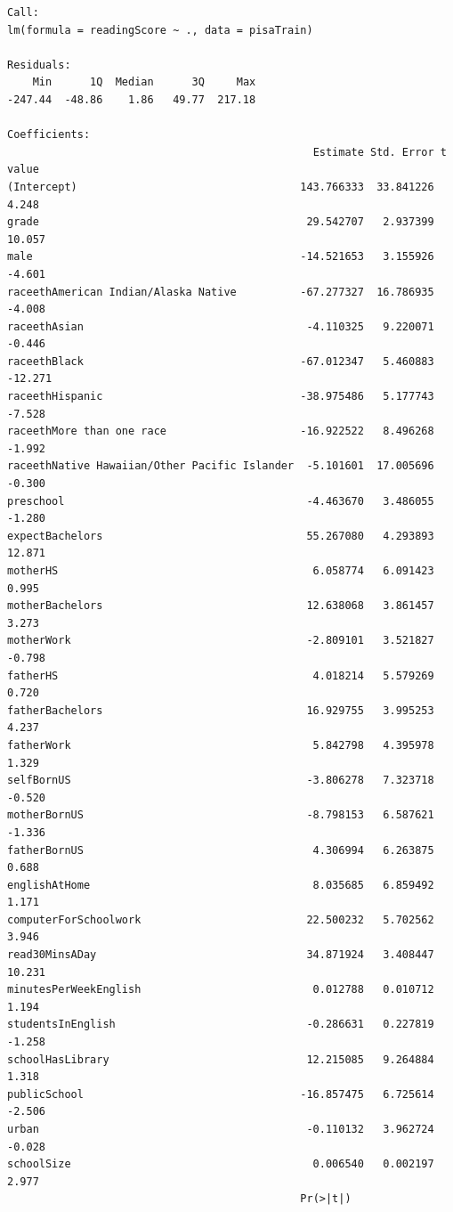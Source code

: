 \documentclass[letterpaper, 9pt, onecolumn, twoside, technote, final]{IEEEtran}
\begin{document}
\begin{verbatim}
Call:
lm(formula = readingScore ~ ., data = pisaTrain)

Residuals:
    Min      1Q  Median      3Q     Max
-247.44  -48.86    1.86   49.77  217.18

Coefficients:
                                                Estimate Std. Error t value
(Intercept)                                   143.766333  33.841226   4.248
grade                                          29.542707   2.937399  10.057
male                                          -14.521653   3.155926  -4.601
raceethAmerican Indian/Alaska Native          -67.277327  16.786935  -4.008
raceethAsian                                   -4.110325   9.220071  -0.446
raceethBlack                                  -67.012347   5.460883 -12.271
raceethHispanic                               -38.975486   5.177743  -7.528
raceethMore than one race                     -16.922522   8.496268  -1.992
raceethNative Hawaiian/Other Pacific Islander  -5.101601  17.005696  -0.300
preschool                                      -4.463670   3.486055  -1.280
expectBachelors                                55.267080   4.293893  12.871
motherHS                                        6.058774   6.091423   0.995
motherBachelors                                12.638068   3.861457   3.273
motherWork                                     -2.809101   3.521827  -0.798
fatherHS                                        4.018214   5.579269   0.720
fatherBachelors                                16.929755   3.995253   4.237
fatherWork                                      5.842798   4.395978   1.329
selfBornUS                                     -3.806278   7.323718  -0.520
motherBornUS                                   -8.798153   6.587621  -1.336
fatherBornUS                                    4.306994   6.263875   0.688
englishAtHome                                   8.035685   6.859492   1.171
computerForSchoolwork                          22.500232   5.702562   3.946
read30MinsADay                                 34.871924   3.408447  10.231
minutesPerWeekEnglish                           0.012788   0.010712   1.194
studentsInEnglish                              -0.286631   0.227819  -1.258
schoolHasLibrary                               12.215085   9.264884   1.318
publicSchool                                  -16.857475   6.725614  -2.506
urban                                          -0.110132   3.962724  -0.028
schoolSize                                      0.006540   0.002197   2.977
                                              Pr(>|t|)

\end{verbatim}
\end{document}
